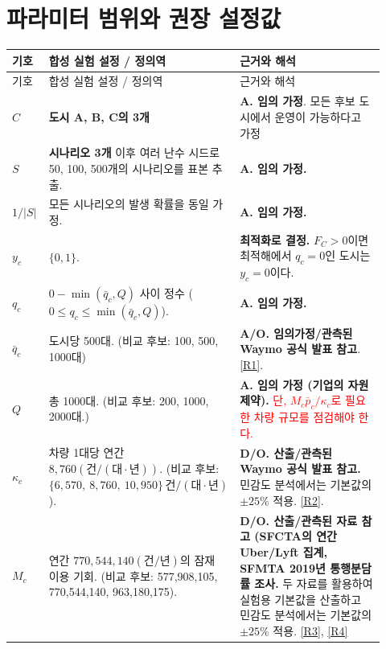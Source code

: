 \documentclass[10pt,a4paper]{article}
\begin{document}
\section{파라미터 범위와 권장 설정값}
\small
\begin{longtable}{P{0.10\linewidth}P{0.34\linewidth}P{0.48\linewidth}}
\toprule 기호 & 합성 실험 설정 / 정의역 & 근거와 해석 \\
\midrule\endfirsthead
\toprule 기호 & 합성 실험 설정 / 정의역 & 근거와 해석 \\
\midrule\endhead

$C$ & \textbf{도시 A, B, C의 3개} & \textbf{A. 임의 가정}. 모든 후보 도시에서 운영이 가능하다고 가정 \\
\midrule

$S$ & \textbf{시나리오 3개} 이후 여러 난수 시드로 50, 100, 500개의 시나리오를 표본 추출. & \textbf{A. 임의 가정.} \\ \midrule

$1/|S|$ & 모든 시나리오의 발생 확률을 동일 가정. & \textbf{A. 임의 가정.} \\ \midrule

$y_c$ & \textbf{$\{0,1\}$}. & \textbf{최적화로 결정.} $F_C > 0$이면 최적해에서 $q_c=0$인 도시는 $y_c=0$이다. \\ \midrule

$q_c$ & \textbf{$0 - \min(\bar q_c,Q)$} 사이 정수 ($0\le q_c\le\min(\bar q_c,Q)$). &  \textbf{A. 임의 가정.} \\ \midrule

$\bar q_c$ & 도시당 500대. (비교 후보: 100, 500, 1000대) & \textbf{A/O. 임의가정/관측된 Waymo 공식 발표 참고}. \hyperlink{rationale-R1}{[R1]}. \\ \midrule

$Q$ & 총 1000대. (비교 후보: 200, 1000, 2000대.) & \textbf{A. 임의 가정 (기업의 자원 제약).} \textcolor{red}{단, $M_c\bar p_c/\kappa_c$로 필요한 차량 규모를 점검해야 한다.} \\ \midrule

$\kappa_c$
& 차량 1대당 연간 $8{,}760(\text{건}/(\text{대}\cdot\text{년}))$.
(비교 후보: $\{6{,}570,\ 8{,}760,\ 10{,}950\}\, \text{건}/(\text{대}\cdot\text{년})$).
& \textbf{D/O. 산출/관측된 Waymo 공식 발표 참고.}
민감도 분석에서는 기본값의 $\pm25\%$ 적용. \hyperlink{rationale-R2}{[R2]}. \\ \midrule


$M_c$ & 연간 $770{,}544{,}140(\text{건}/\text{년})$의 잠재 이용 기회. (비교 후보: 577,908,105, 770,544,140, 963,180,175). & \textbf{D/O. 산출/관측된 자료 참고 (SFCTA의 연간 Uber/Lyft 집계, SFMTA 2019년 통행분담률 조사.} 두 자료를 활용하여 실험용 기본값을 산출하고 민감도 분석에서는 기본값의 $\pm25\%$ 적용. \hyperlink{rationale-R3}{[R3]}, \hyperlink{rationale-R4}{[R4]} \\ \midrule


\end{longtable}
\end{document}
